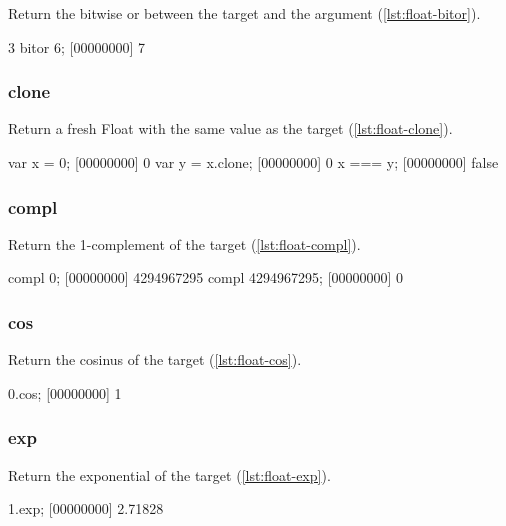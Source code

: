 Return the bitwise or between the target and the argument (\autoref{lst:float-bitor}).

\begin{urbiscript}[caption=Float.bitor, label=lst:float-bitor]
3 bitor 6;
[00000000] 7
\end{urbiscript}

\subsubsection{clone}

Return a fresh Float with the same value as the target (\autoref{lst:float-clone}).

\begin{urbiscript}[caption=Float.clone, label=lst:float-clone]
var x = 0;
[00000000] 0
var y = x.clone;
[00000000] 0
x === y;
[00000000] false
\end{urbiscript}

\subsubsection{compl}

Return the 1-complement of the target (\autoref{lst:float-compl}).

\begin{urbiscript}[caption=Float.compl, label=lst:float-compl]
compl 0;
[00000000] 4294967295
compl 4294967295;
[00000000] 0
\end{urbiscript}

\subsubsection{cos}

Return the cosinus of the target (\autoref{lst:float-cos}).

\begin{urbiscript}[caption=Float.cos, label=lst:float-cos]
0.cos;
[00000000] 1
\end{urbiscript}

\subsubsection{exp}

Return the exponential of the target (\autoref{lst:float-exp}).

\begin{urbiscript}[caption=Float.exp, label=lst:float-exp]
1.exp;
[00000000] 2.71828
\end{urbiscript}


